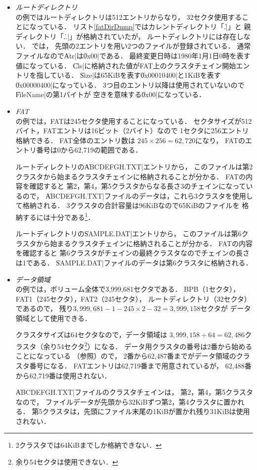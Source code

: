 \begin{itemize}
\item \emph{ルートディレクトリ}\\
  の例ではルートディレクトリは512エントリからなり，
  32セクタ使用することになっている．
  リスト\ref{fatDirDump}ではカレントディレクトリ「\|.|」と
  親ディレクトリ「\|..|」が格納されていたが，
  ルートディレクトリには存在しない．
  では，
  先頭の2エントリを用い2つのファイルが登録されている．
  通常ファイルなので\|Atr|は\|0x00|である．
  最終変更日時は1980年1月1日0時を表す値になっている．
  \|Cls|に格納された値がFAT上のクラスタチェイン開始エントリを指している．
  \|Size|は65KiBを表す\|0x00010400|と1KiBを表す\|0x00000400|になっている．
  3つ目のエントリ以降は使用されていないので\|FileName|の第1バイトが
  空きを意味する\|0x00|になっている．

\item \emph{FAT}\\
  の例では，FATは245セクタ使用することになっている．
  セクタサイズが512バイト，FATエントリは16ビット（2バイト）なので
  1セクタに256エントリ格納できる．
  FAT全体のエントリ数は
  $245 \times 256 = 62,720$になり，
  FATのエントリ番号は0から62,719の範囲である．

  ルートディレクトリの\|ABCDEFGH.TXT|エントリから，
  このファイルは第2クラスタから始まるクラスタチェインに格納されることが分かる．
  FATの内容を確認すると
  第2，第4，第5クラスタからなる長さ3のチェインになっているので，
  \|ABCDEFGH.TXT|ファイルのデータは，これら3クラスタを使用して格納される．
  3クラスタの合計容量は96KiBなので65KiBのファイルを
  格納するには十分である\footnote{2クラスタでは64KiBまでしか格納できない．}．

  ルートディレクトリの\|SAMPLE.DAT|エントリから，
  このファイルは第6クラスタから始まるクラスタチェインに格納されることが分かる．
  FATの内容を確認すると
  第6クラスタがチェインの最終クラスタなのでチェインの長さは1である．
  \|SAMPLE.DAT|ファイルのデータは第6クラスタに格納される．

\item \emph{データ領域}\\
  の例では，ボリューム全体で3,999,681セクタである．
  BPB（1セクタ），FAT1（245セクタ），FAT2（245セクタ），
  ルートディレクトリ（32セクタ）であるので，
  残り$3,999,681 - 1 - 245 \times 2 - 32 = 3,999,158$セクタが
  データ領域として使用できる．

  クラスタサイズは64セクタなので，データ領域は
  $3,999,158 \div 64 = 62,486$クラスタ（余り54セクタ\footnote{
      余り54セクタは使用できない．
  }）になる．
  データ用クラスタの番号は2番から始めることになっている
  （参照）ので，
  2番から62,487番までがデータ領域のクラスタ番号になる．
  FATエントリは62,719番まで用意されているが，
  62,488番から62,719番は使用されない．

  \|ABCDEFGH.TXT|ファイルのクラスタチェインは，
  第2，第4，第5クラスタなので，
  ファイルデータが先頭から32KiBずつ第2，第4クラスタに置かれる．
  第5クラスタは，先頭にファイル末尾の1KiBが置かれ残り31KiBは使用されない．
\end{itemize}

